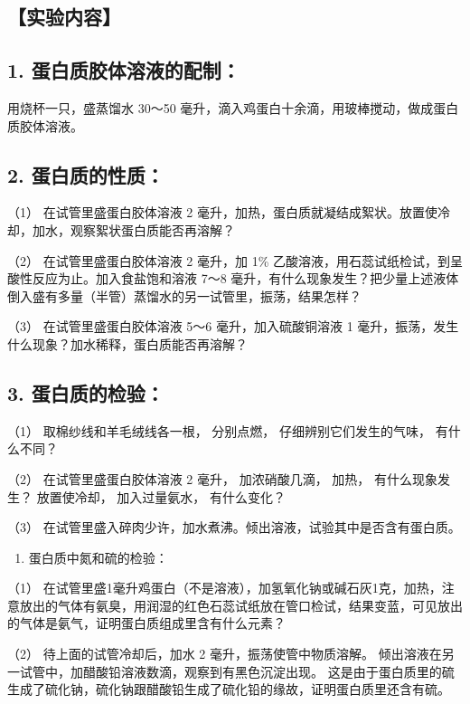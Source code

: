 \subsection{【实验内容】}

\subsection{1. 蛋白质胶体溶液的配制：}

用烧杯一只，盛蒸馏水 30～50
毫升，滴入鸡蛋白十余滴，用玻棒搅动，做成蛋白质胶体溶液。

\subsection{2. 蛋白质的性质：}

（1） 在试管里盛蛋白胶体溶液 2
毫升，加热，蛋白质就凝结成絮状。放置使冷却，加水，观察絮状蛋白质能否再溶解？

（2） 在试管里盛蛋白胶体溶液 2 毫升，加 1\%
乙酸溶液，用石蕊试纸检试，到呈酸性反应为止。加入食盐饱和溶液 7～8
毫升，有什么现象发生？把少量上述液体倒入盛有多量（半管）蒸馏水的另一试管里，振荡，结果怎样？

（3） 在试管里盛蛋白胶体溶液 5～6 毫升，加入硫酸铜溶液 1
毫升，振荡，发生什么现象？加水稀释，蛋白质能否再溶解？

\subsection{3. 蛋白质的检验：}

（1） 取棉纱线和羊毛绒线各一根， 分别点燃， 仔细辨别它们发生的气味，
有什么不同？

（2） 在试管里盛蛋白胶体溶液 2 毫升， 加浓硝酸几滴， 加热，
有什么现象发生？ 放置使冷却， 加入过量氨水， 有什么变化？

（3） 在试管里盛入碎肉少许，加水煮沸。倾出溶液，试验其中是否含有蛋白质。

\begin{enumerate}[start=4]
\item
  蛋白质中氮和硫的检验：
\end{enumerate}

（1）
在试管里盛1毫升鸡蛋白（不是溶液），加氢氧化钠或碱石灰1克，加热，注意放出的气体有氨臭，用润湿的红色石蕊试纸放在管口检试，结果变蓝，可见放出的气体是氨气，证明蛋白质组成里含有什么元素？

（2） 待上面的试管冷却后，加水 2 毫升，振荡使管中物质溶解。
倾出溶液在另一试管中，加醋酸铅溶液数滴，观察到有黑色沉淀出现。
这是由于蛋白质里的硫生成了硫化钠，硫化钠跟醋酸铅生成了硫化铅的缘故，证明蛋白质里还含有硫。

